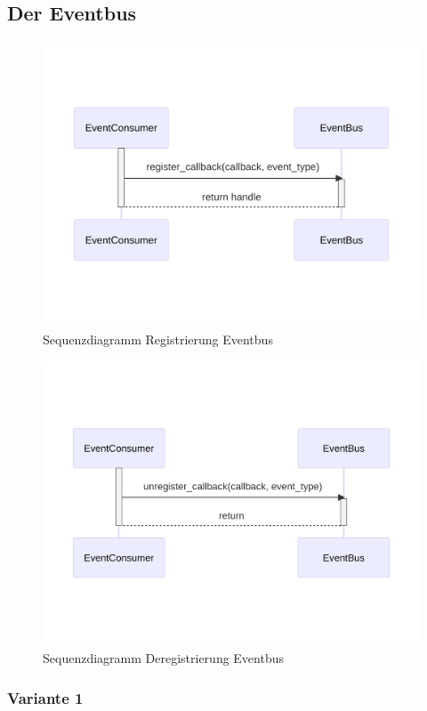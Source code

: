 \subsection{Der Eventbus}

\begin{figure}[!hb]
	\centering
	\includegraphics[width=0.75\linewidth]{images/diagrams/eventbus-register-seq.png}
	\caption{Sequenzdiagramm Registrierung Eventbus}
	\label{fig:eventbus-register-seq}
\end{figure}

\begin{figure}[!hb]
	\centering
	\includegraphics[width=0.75\linewidth]{images/diagrams/eventbus-unregister-seq.png}
	\caption{Sequenzdiagramm Deregistrierung Eventbus}
	\label{fig:eventbus-unregister-seq}
\end{figure}

\subsubsection*{Variante 1}

